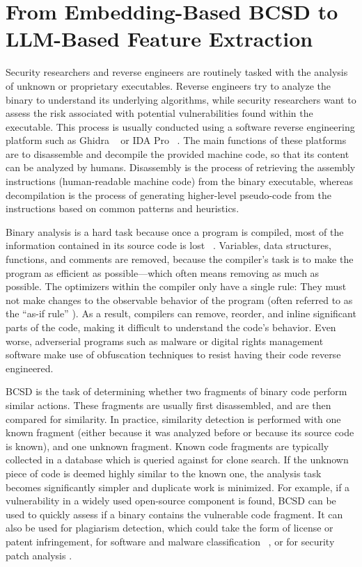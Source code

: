 \section{From Embedding-Based BCSD to LLM-Based Feature Extraction}
\label{sec:method}

Security researchers and reverse engineers are routinely tasked with the analysis of unknown or proprietary executables.
Reverse engineers try to analyze the binary to understand its underlying algorithms, while security researchers want to assess
the risk associated with potential vulnerabilities found within the executable. This process is usually conducted using
a software reverse engineering platform such as Ghidra ~\cite{ghidra} or IDA Pro ~\cite{ida}. The main functions of these platforms are to
disassemble and decompile the provided machine code, so that its content can be analyzed by humans. Disassembly is
the process of retrieving the assembly instructions (human-readable machine code) from the binary executable, whereas decompilation
is the process of generating higher-level pseudo-code from the instructions based on common patterns and heuristics.

Binary analysis is a hard task because once a program is compiled, most of the information contained in its source code
is lost ~\cite{BCSDsurvey}. Variables, data structures, functions, and comments are removed, because the compiler's task is to make
the program as efficient as possible---which often means removing as much as possible. The optimizers within the compiler
only have a single rule: They must not make changes to the observable behavior of the program (often referred
to as the ``as-if rule'' \cite{c++11}). As a result, compilers can remove, reorder, and inline significant parts of the code, making
it difficult to understand the code's behavior. Even worse, adverserial programs such as malware or digital rights management software
make use of obfuscation techniques to resist having their code reverse engineered.

BCSD is the task of determining whether two fragments of binary code perform similar actions.
These fragments are usually first disassembled, and are then compared for similarity. In practice,
similarity detection is performed with one known fragment (either because it was analyzed before
or because its source code is known), and one unknown fragment. Known code fragments are typically collected in a
database which is queried against for clone search. If the unknown piece of code is deemed
highly similar to the known one, the analysis task becomes significantly simpler and duplicate work is minimized. For example,
if a vulnerability in a widely used open-source component is found, BCSD can be used to quickly
assess if a binary contains the vulnerable code fragment. It can also be used for plagiarism detection, which
could take the form of license or patent infringement, for software and malware classification ~\cite{op-seq}, or for 
security patch analysis \cite{patch}. 



